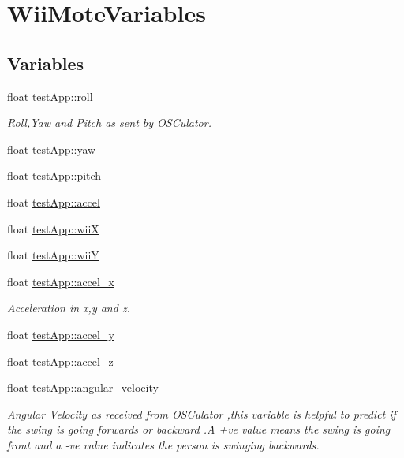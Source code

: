\hypertarget{group___wii_mote_variables}{\section{Wii\-Mote\-Variables}
\label{group___wii_mote_variables}
}
\subsection*{Variables}
\begin{DoxyCompactItemize}
\item 
float \hyperlink{group___wii_mote_variables_ga020730abb55e6ae6d0a28edee19050e0}{test\-App\-::roll}
\begin{DoxyCompactList}\small\item\em Roll,Yaw and Pitch as sent by O\-S\-Culator. \end{DoxyCompactList}\item 
float \hyperlink{group___wii_mote_variables_ga865985f78dd5def3ed20c87b9fc772b6}{test\-App\-::yaw}
\item 
float \hyperlink{group___wii_mote_variables_gaabbebeb113838374f659e86a0355b260}{test\-App\-::pitch}
\item 
float \hyperlink{group___wii_mote_variables_ga8e560e923c82d421857538e4a5927542}{test\-App\-::accel}
\item 
float \hyperlink{group___wii_mote_variables_ga7a77e8633c3a94e3e409a33a5cd9ae3f}{test\-App\-::wii\-X}
\item 
float \hyperlink{group___wii_mote_variables_ga5ae41896388ae16ee530beca5333e02a}{test\-App\-::wii\-Y}
\item 
float \hyperlink{group___wii_mote_variables_gad1738ff98d225f80b853a9ddc9f5a116}{test\-App\-::accel\-\_\-x}
\begin{DoxyCompactList}\small\item\em Acceleration in x,y and z. \end{DoxyCompactList}\item 
float \hyperlink{group___wii_mote_variables_ga204bcb2412a70a65ebea6008ee8c4eb0}{test\-App\-::accel\-\_\-y}
\item 
float \hyperlink{group___wii_mote_variables_ga61dbdd5c0b868568dde40a52f6e56054}{test\-App\-::accel\-\_\-z}
\item 
float \hyperlink{group___wii_mote_variables_ga98e05c3206ff95fccfebfc9df5317598}{test\-App\-::angular\-\_\-velocity}
\begin{DoxyCompactList}\small\item\em Angular Velocity as received from O\-S\-Culator ,this variable is helpful to predict if the swing is going forwards or backward .A +ve value means the swing is going front and a -\/ve value indicates the person is swinging backwards. \end{DoxyCompactList}\item 

\end{DoxyCompactItemize}
